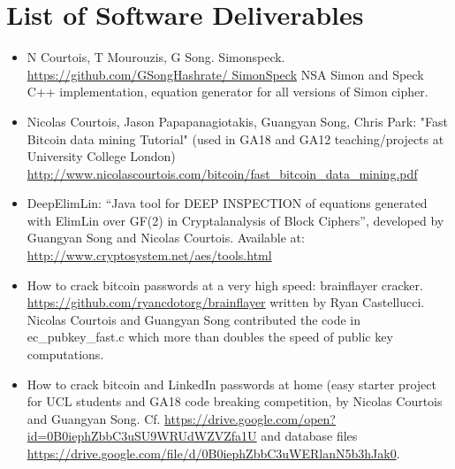 \documentclass[12pt,phd,a4paper,oneside]{ucl_thesis}
\begin{document}
\chapter*{List of Software Deliverables}
\begin{itemize}
	\item  N Courtois, T Mourouzis, G Song. Simonspeck. \url{https://github.com/GSongHashrate/ SimonSpeck}
	NSA Simon and Speck C++ implementation, equation generator for all versions of Simon cipher.
	\item Nicolas Courtois, Jason Papapanagiotakis, Guangyan Song, Chris Park:
	"Fast Bitcoin data mining Tutorial" (used in GA18 and GA12 teaching/projects at University College London)
	\url{http://www.nicolascourtois.com/bitcoin/fast_bitcoin_data_mining.pdf}
	\item DeepElimLin: 
	``Java tool for DEEP INSPECTION of equations generated with ElimLin over GF(2)
	in Cryptalanalysis of Block Ciphers'', developed by Guangyan Song and Nicolas Courtois.
	Available at:
	\url{http://www.cryptosystem.net/aes/tools.html}
	\item How to crack bitcoin passwords at a very high speed: brainflayer cracker.
	\url{https://github.com/ryancdotorg/brainflayer} written by Ryan Castellucci. Nicolas
	Courtois and Guangyan Song contributed the code in ec\_pubkey\_fast.c
	which more than doubles the speed of public key computations. 
	
	\item How to crack bitcoin and LinkedIn passwords at home 
	(easy starter project for UCL students and GA18 code breaking competition, 
	by Nicolas Courtois and Guangyan Song. Cf. 
	\url{https://drive.google.com/open?id=0B0iephZbbC3uSU9WRUdWZVZfa1U}
	and database files \url{https://drive.google.com/file/d/0B0iephZbbC3uWERlanN5b3hJak0}. 
\end{itemize}










 


%



\end{document}
